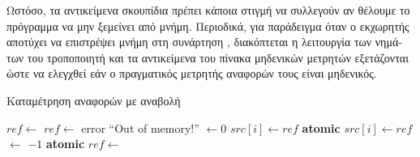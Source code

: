 \begin{greek}
Ωστόσο, τα αντικείμενα σκουπίδια πρέπει κάποια στιγμή να
συλλεγούν αν θέλουμε το πρόγραμμα να μην ξεμείνει από μνήμη.
Περιοδικά, για παράδειγμα όταν ο εκχωρητής αποτύχει να
επιστρέψει μνήμη στη συνάρτηση , διακόπτεται
η λειτουργία των νημάτων του τροποποιητή και τα αντικείμενα
του πίνακα μηδενικών μετρητών εξετάζονται ώστε να ελεγχθεί
εάν ο πραγματικός μετρητής αναφορών τους είναι μηδενικός.

\begin{algorithm}[H]
  \caption{Καταμέτρηση αναφορών με αναβολή}
  \label{alg:refcnt_2}
  \begin{algorithmic}[1]
      \State $ref \gets$ 
        \State {}
        \State $ref \gets$ 
          \State error ``Out of memory!''
        \EndIf
      \EndIf
      \State {} $\gets 0$
      \State {}
      \State {}
    \EndFunction
    \Statex
        \State $src[i] \gets ref$
      \Else
        \State \textbf{atomic}
        \State {}
        \State {}
        \State {}
        \State $src[i] \gets ref$
      \EndIf
    \EndProcedure
    \Statex
        \State {} $\gets$  $-1$
          \State {} 
        \EndIf
      \EndIf
    \EndProcedure
    \Statex
      \State \textbf{atomic}
       
        \State {}
      \EndFor
      \State {}
       
        \State {}
      \EndFor
    \EndProcedure
    \Statex
        \State $ref \gets$ 
         
            \State {}
          \EndFor
          \State {}
        \EndIf
      \EndWhile
    \EndProcedure
  \end{algorithmic}
\end{algorithm}


\end{greek}
